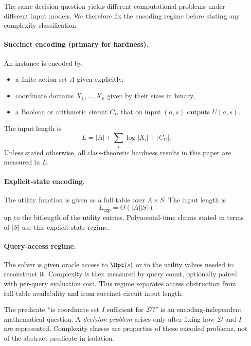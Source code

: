 The same decision question yields different computational problems under different input models. We therefore fix the encoding regime before stating any complexity classification.

\paragraph{Succinct encoding (primary for hardness).}
An instance is encoded by:
\begin{itemize}
\item a finite action set $A$ given explicitly,
\item coordinate domains $X_1,\ldots,X_n$ given by their sizes in binary,
\item a Boolean or arithmetic circuit $C_U$ that on input $(a,s)$ outputs $U(a,s)$.
\end{itemize}
The input length is
\[
L = |A| + \sum_i \log |X_i| + |C_U|.
\]
Unless stated otherwise, all class-theoretic hardness results in this paper are measured in $L$.

\paragraph{Explicit-state encoding.}
The utility function is given as a full table over $A \times S$. The input length is
\[
L_{\mathrm{exp}} = \Theta(|A||S|)
\]
up to the bitlength of the utility entries. Polynomial-time claims stated in terms of $|S|$ use this explicit-state regime.

\paragraph{Query-access regime.}
The solver is given oracle access to $\Opt(s)$ or to the utility values needed to reconstruct it. Complexity is then measured by query count, optionally paired with per-query evaluation cost. This regime separates access obstruction from full-table availability and from succinct circuit input length.

\begin{remark}\label{rem:question-vs-problem}
The predicate ``is coordinate set $I$ sufficient for $\mathcal{D}$?'' is an encoding-independent mathematical question. A \emph{decision problem} arises only after fixing how $\mathcal{D}$ and $I$ are represented. Complexity classes are properties of these encoded problems, not of the abstract predicate in isolation.
\end{remark}



